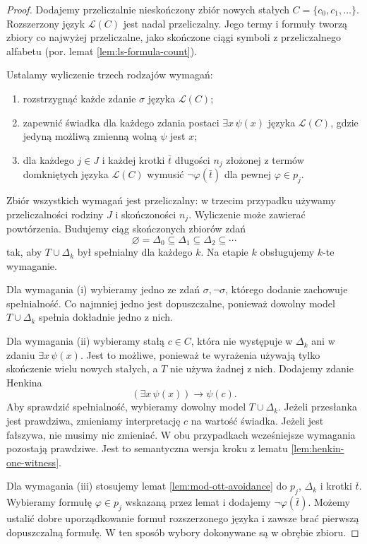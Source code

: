\begin{proof}
Dodajemy przeliczalnie nieskończony zbiór nowych
stałych $C=\{c_0,c_1,\ldots\}$.
Rozszerzony język $\mathcal L(C)$ jest nadal
przeliczalny. Jego termy i formuły tworzą zbiory
co najwyżej przeliczalne, jako skończone ciągi
symboli z przeliczalnego alfabetu (por. lemat
\ref{lem:ls-formula-count}).

Ustalamy wyliczenie trzech rodzajów wymagań:
\begin{enumerate}[label=(\roman*)]
\item rozstrzygnąć każde zdanie $\sigma$ języka
$\mathcal L(C)$;
\item zapewnić świadka dla każdego zdania postaci
$\exists x\,\psi(x)$ języka $\mathcal L(C)$,
gdzie jedyną możliwą zmienną wolną $\psi$ jest $x$;
\item dla każdego $j\in J$ i każdej krotki $\bar t$
długości $n_j$ złożonej z termów domkniętych
języka $\mathcal L(C)$ wymusić
$\neg\varphi(\bar t)$ dla pewnej $\varphi\in p_j$.
\end{enumerate}
Zbiór wszystkich wymagań jest przeliczalny:
w trzecim przypadku używamy przeliczalności
rodziny $J$ i skończoności $n_j$.
Wyliczenie może zawierać powtórzenia.
Budujemy ciąg skończonych zbiorów zdań
\[
\varnothing=\Delta_0\subseteq\Delta_1
\subseteq\Delta_2\subseteq\cdots
\]
tak, aby $T\cup\Delta_k$ był spełnialny dla każdego
$k$. Na etapie $k$ obsługujemy $k$-te wymaganie.

Dla wymagania (i) wybieramy jedno ze zdań
$\sigma,\neg\sigma$, którego dodanie zachowuje
spełnialność. Co najmniej jedno jest dopuszczalne,
ponieważ dowolny model $T\cup\Delta_k$ spełnia
dokładnie jedno z nich.

Dla wymagania (ii) wybieramy stałą $c\in C$,
która nie występuje w $\Delta_k$ ani w zdaniu
$\exists x\,\psi(x)$. Jest to możliwe, ponieważ
te wyrażenia używają tylko skończenie wielu
nowych stałych, a $T$ nie używa żadnej z nich.
Dodajemy zdanie Henkina
\[
(\exists x\,\psi(x))\to\psi(c).
\]
Aby sprawdzić spełnialność, wybieramy dowolny
model $T\cup\Delta_k$. Jeżeli przesłanka jest
prawdziwa, zmieniamy interpretację $c$ na
wartość świadka. Jeżeli jest fałszywa, nie musimy
nic zmieniać. W obu przypadkach wcześniejsze
wymagania pozostają prawdziwe.
Jest to semantyczna wersja kroku z lematu
\ref{lem:henkin-one-witness}.

Dla wymagania (iii) stosujemy lemat
\ref{lem:mod-ott-avoidance} do $p_j$,
$\Delta_k$ i krotki $\bar t$. Wybieramy formułę
$\varphi\in p_j$ wskazaną przez lemat i dodajemy
$\neg\varphi(\bar t)$.
Możemy ustalić dobre uporządkowanie formuł
rozszerzonego języka i zawsze brać pierwszą
dopuszczalną formułę. W ten sposób wybory
dokonywane są w obrębie zbioru.


\end{proof}

